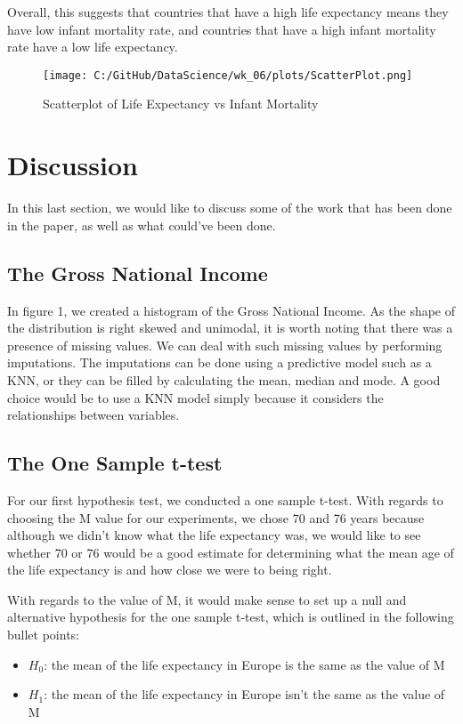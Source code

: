 \documentclass[a4paper, twocolumn]{article}
\begin{document}
Overall, this suggests that countries that have a high life expectancy means they have low infant mortality rate,
and countries that have a high infant mortality rate have a low life expectancy.

\begin{figure}[htbp] 
    \centering
    \texttt{[image: C:/GitHub/DataScience/wk\_06/plots/ScatterPlot.png]}
    \caption{Scatterplot of Life Expectancy vs Infant Mortality} 
\end{figure}


\section{Discussion}
In this last section, we would like to discuss some of the work that has been done in the paper, as well as what
could've been done.

\subsection{The Gross National Income}
In figure 1, we created a histogram of the Gross National Income. As the shape of the distribution is right skewed 
and unimodal, it is worth noting that there was a presence of missing values. We can deal with such missing values
by performing imputations. The imputations can be done using a predictive model such as a KNN, or they can be filled
by calculating the mean, median and mode. A good choice would be to use a KNN model simply because it considers the 
relationships between variables.

\subsection{The One Sample t-test}
For our first hypothesis test, we conducted a one sample t-test. With regards to choosing the M value for our 
experiments, we chose 70 and 76 years because although we didn't know what the life expectancy was, we would like 
to see whether 70 or 76 would be a good estimate for determining what the mean age of the life expectancy is and how 
close we were to being right.

With regards to the value of M, it would make sense to set up a null and alternative hypothesis for the one sample
t-test, which is outlined in the following bullet points:

\begin{itemize}
    \item $H_0$: the mean of the life expectancy in Europe is the same as the value of M
    \item $H_1$: the mean of the life expectancy in Europe isn't the same as the value of M
\end{itemize}
\end{document}
